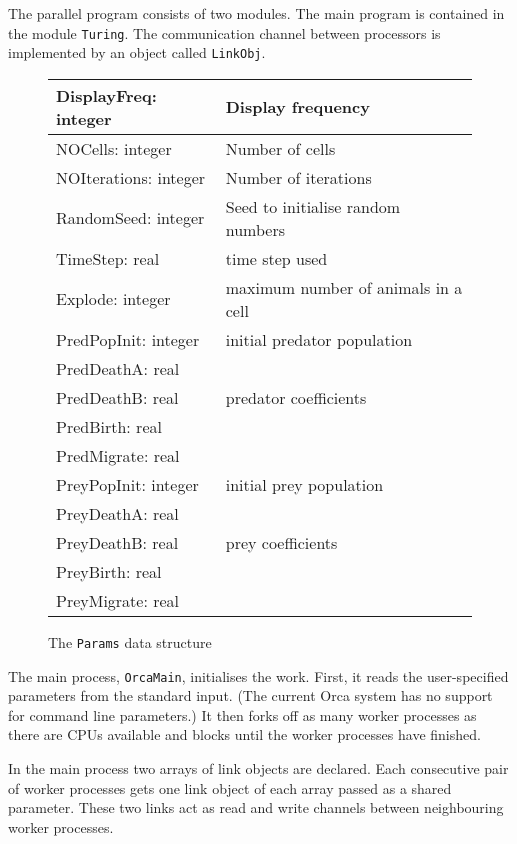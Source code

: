 The parallel program consists of two modules. The main program is
contained in the module {\tt Turing}.
The communication channel between processors is implemented by an
object called {\tt LinkObj}.

\begin{figure}
\begin{center}
\begin{tabular}{|l|l|}
\hline
DisplayFreq: integer	& Display frequency \\
\hline
NOCells: integer	& Number of cells \\
\hline
NOIterations: integer	& Number of iterations \\
\hline
RandomSeed: integer	& Seed to initialise random numbers \\
\hline
TimeStep: real		& time step used \\
\hline
Explode: integer	& maximum number of animals in a cell \\
\hline
PredPopInit: integer	& initial predator population \\
\hline
PredDeathA: real	& \\
PredDeathB: real	& predator coefficients \\
PredBirth: real		& \\
PredMigrate: real	& \\
\hline
PreyPopInit: integer	& initial prey population \\
\hline
PreyDeathA: real	& \\
PreyDeathB: real	& prey coefficients \\
PreyBirth: real		& \\
PreyMigrate: real	& \\
\hline
\end{tabular}
\end{center}
\caption{The {\tt Params} data structure}
\label{fParams}
\end{figure}

The main process, {\tt OrcaMain}, initialises the work. First, it
reads the user-specified parameters from the standard input. (The
current Orca system has no support for command line parameters.) It
then forks off as many worker processes as there are CPUs available
and blocks until the worker processes have finished.

In the main process two arrays of link objects are declared. Each consecutive 
pair
of worker processes gets one link object of each array passed as a shared
parameter. These two links act as read and write channels between
neighbouring worker processes.

